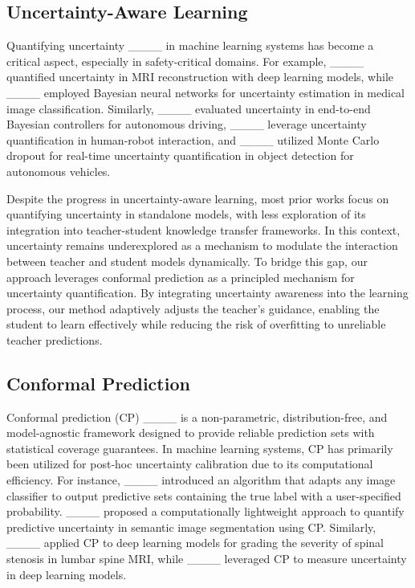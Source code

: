 \subsection{Uncertainty-Aware Learning}
\vspace{-5pt}
Quantifying uncertainty ____ in machine learning systems has become a critical aspect, especially in safety-critical domains. For example, ____ quantified uncertainty in MRI reconstruction with deep learning models, while ____ employed Bayesian neural networks for uncertainty estimation in medical image classification. Similarly, ____ evaluated uncertainty in end-to-end Bayesian controllers for autonomous driving, ____ leverage uncertainty quantification in human-robot interaction, and ____ utilized Monte Carlo dropout for real-time uncertainty quantification in object detection for autonomous vehicles.

Despite the progress in uncertainty-aware learning, most prior works focus on quantifying uncertainty in standalone models, with less exploration of its integration into teacher-student knowledge transfer frameworks. In this context, uncertainty remains underexplored as a mechanism to modulate the interaction between teacher and student models dynamically. To bridge this gap, our approach leverages conformal prediction as a principled mechanism for uncertainty quantification. By integrating uncertainty awareness into the learning process, our method adaptively adjusts the teacher's guidance, enabling the student to learn effectively while reducing the risk of overfitting to unreliable teacher predictions.

\subsection{Conformal Prediction}
\vspace{-5pt}
Conformal prediction (CP) ____ is a non-parametric, distribution-free, and model-agnostic framework designed to provide reliable prediction sets with statistical coverage guarantees. In machine learning systems, CP has primarily been utilized for post-hoc uncertainty calibration due to its computational efficiency. For instance, ____ introduced an algorithm that adapts any image classifier to output predictive sets containing the true label with a user-specified probability. ____ proposed a computationally lightweight approach to quantify predictive uncertainty in semantic image segmentation using CP. Similarly, ____ applied CP to deep learning models for grading the severity of spinal stenosis in lumbar spine MRI, while ____ leveraged CP to measure uncertainty in deep learning models.

